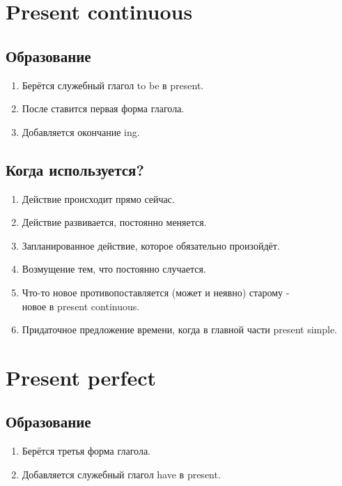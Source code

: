 \documentclass[oneside]{book}
\begin{document}
    \section{Present continuous}
    \subsection{Образование}
    \begin{enumerate}
        \item Берётся служебный глагол to be в present.
        \item После ставится первая форма глагола.
        \item Добавляется окончание ing.
    \end{enumerate}

    \subsection{Когда используется?}
    \begin{enumerate}
        \item Действие происходит прямо сейчас.

        \item Действие развивается, постоянно меняется.

        \item Запланированное действие, которое обязательно произойдёт.

        \item Возмущение тем, что постоянно случается.

        \item Что-то новое противопоставляется (может и неявно) старому - \\
        новое в present continuous.

        \item Придаточное предложение времени, когда в главной части present simple.
    \end{enumerate}

    \section{Present perfect}
    \subsection{Образование}
    \begin{enumerate}
        \item Берётся третья форма глагола.
        \item Добавляется служебный глагол have в present.
    \end{enumerate}
\end{document}
